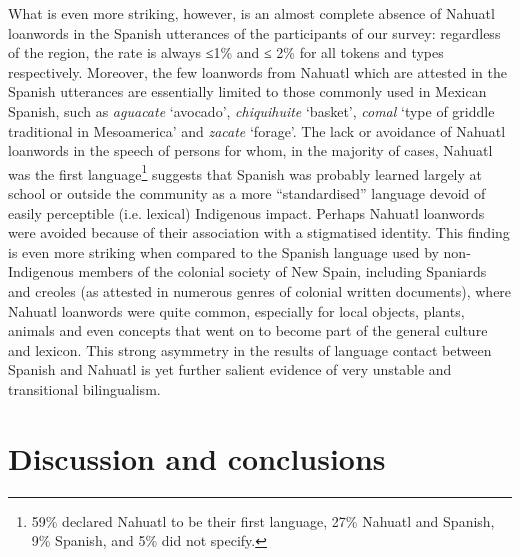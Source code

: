 \documentclass[output=paper,hidelinks]{langscibook}
\begin{document}
What is even more striking, however, is an almost complete absence of Nahuatl loanwords in the Spanish utterances of the participants of our survey: regardless of the region, the rate is always ≤1\% and ≤ 2\% for all tokens and types respectively. Moreover, the few loanwords from Nahuatl which are attested in the Spanish utterances are essentially limited to those commonly used in Mexican Spanish, such as \textit{aguacate} ‘avocado’, \textit{chiquihuite} ‘basket’, \textit{comal} ‘type of griddle traditional in Mesoamerica’ and \textit{zacate} ‘forage’. The lack or avoidance of Nahuatl loanwords in the speech of persons for whom, in the majority of cases, Nahuatl was the first language\footnote{59\% declared Nahuatl to be their first language, 27\% Nahuatl and Spanish, 9\% Spanish, and 5\% did not specify.} suggests that Spanish was probably learned largely at school or outside the community as a more ``standardised'' language devoid of easily perceptible (i.e. lexical) Indigenous impact. Perhaps Nahuatl loanwords were avoided because of their association with a stigmatised identity. This finding is even more striking when compared to the Spanish language used by non-Indigenous members of the colonial society of New Spain, including Spaniards and creoles (as attested in numerous genres of colonial written documents), where Nahuatl loanwords were quite common, especially for local objects, plants, animals and even concepts that went on to become part of the general culture and lexicon. This strong asymmetry in the results of language contact between Spanish and Nahuatl is yet further salient evidence of very unstable and transitional bilingualism.

\section{Discussion and conclusions}
\end{document}
